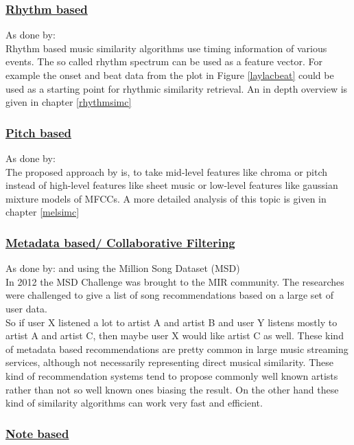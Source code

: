 \subsubsection{\underline{Rhythm based}}

As done by: \cite{rhythm1}\\
Rhythm based music similarity algorithms use timing information of various events. The so called rhythm spectrum can be used as a feature vector.
For example the onset and beat data from the plot in Figure \ref{laylacbeat} could be used as a starting point for rhythmic similarity retrieval.
An in depth overview is given in chapter \ref{rhythmsimc}

\subsubsection{\underline{Pitch based}}

As done by: \cite{pitch1}\\
The proposed approach by \cite{pitch1} is, to take mid-level features like chroma or pitch instead of high-level features like sheet music or low-level features like gaussian mixture models of MFCCs. 
A more detailed analysis of this topic is given in chapter \ref{melsimc}


\subsubsection{\underline{Metadata based/ Collaborative Filtering}}

As done by: \cite{metadat1} and \cite{msd4} using the Million Song Dataset (MSD) \cite{msd1}\\
In 2012 the MSD Challenge was brought to the MIR community. The researches were challenged to give a list of song recommendations based on a large set of user data.\\ 
So if user X listened a lot to artist A and artist B and user Y listens mostly to artist A and artist C, then maybe user X would like artist C as well. 
These kind of metadata based recommendations are pretty common in large music streaming services, although not necessarily representing direct musical similarity.
These kind of recommendation systems tend to propose commonly well known artists rather than not so well known ones biasing the result. 
On the other hand these kind of similarity algorithms can work very fast and efficient.  

\subsubsection{\underline{Note based}}

